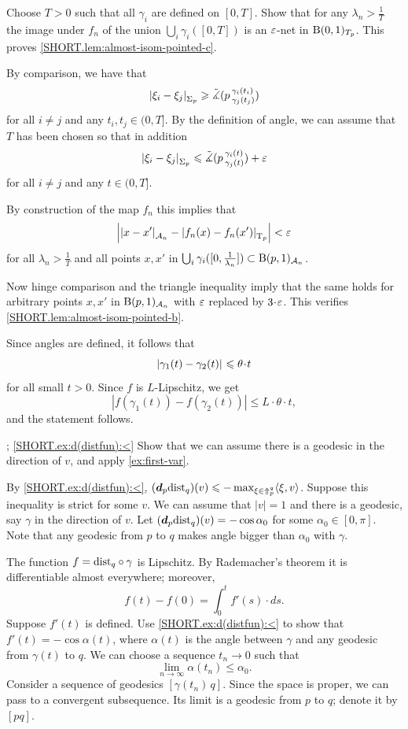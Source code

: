 Choose $T>0$ such that all $\gamma_i$ are defined on $[0,T]$.
Show that for any $\lambda_n>\frac{1}{T}$ the image under $f_n$ of the union $\bigcup_i\gamma_i([0,T])$ is an $\varepsilon$-net in $\mathrm{B}{}(0,1)_{T_p}$.
This proves \ref{SHORT.lem:almost-isom-pointed-c}.

By comparison, we have that
\[\dist{\xi_i}{\xi_j}{\Sigma_p}\ge \angk p{\gamma_i(t_i)}{\gamma_j(t_j)}\]
for all $i\ne j$ and any $t_i,t_j\in (0,T]$.
By the definition of angle, we can assume that $T$ has been chosen so that in addition
\[\dist{\xi_i}{\xi_j}{\Sigma_p}\le \angk p{\gamma_i(t)}{\gamma_j(t)}+\eps\]
for all $i\ne j$ and any $t\in (0,T]$.

By construction of the map $f_n$ this implies that 
\[\left|\dist{x}{x'}{\spc{A}_n}-\dist{f_n(x)}{f_n(x')}{\T_p}\right|<\eps\]
for all $\lambda_n>\frac{1}{T}$ and all points $x,x'$ in $\bigcup_i\gamma_i([0,\frac{1}{\lambda_n}])\subset \mathrm{B}{}(p,1)_{\mathcal{A}_n}$.

Now hinge comparison and the triangle inequality imply that the same holds for arbitrary points $x,x'$ in $\mathrm{B}{}(p,1)_{\mathcal{A}_n}$ with $\varepsilon$ replaced by $3\cdot\eps$.
This verifies \ref{SHORT.lem:almost-isom-pointed-b}.


Since angles are defined, it follows that 
\[\dist{\gamma_1(t)}{\gamma_2(t)}{}\le \theta\cdot t\]
for all small $t>0$.
Since $f$ is $L$-Lipschitz, we get 
\[|f(\gamma_1(t))-f(\gamma_2(t))|\le L\cdot \theta\cdot t,\]
and the statement follows.

\parbf{\ref{ex:d(distfun)}}; \ref{SHORT.ex:d(distfun):<}
Show that we can assume there is a geodesic in the direction of $v$, and apply \ref{ex:first-var}.

By \ref{SHORT.ex:d(distfun):<}, $(\bm{d}_p\mathrm{dist}_q)(v)\leqslant-\max_{\xi\in\Uparrow_p^q}\langle\xi,v\rangle$.
Suppose this inequality is strict for some $v$.
We can assume that $|v|=1$ and there is a geodesic, say $\gamma$ in the direction of $v$.
Let $(\bm{d}_p\mathrm{dist}_q)(v)=-\cos\alpha_0$ for some $\alpha_0\in [0,\pi]$.
Note that any geodesic from $p$ to $q$ makes angle bigger than $\alpha_0$ with $\gamma$.

The function $f=\mathrm{dist}_q\circ\gamma$ is Lipschitz.
By Rademacher's theorem it is differentiable almost everywhere;
moreover, 
\[f(t)-f(0)=\int_0^t f'(s)\cdot ds.\]
Suppose $f'(t)$ is defined.
Use \ref{SHORT.ex:d(distfun):<} to show that 
$f'(t)=-\cos\alpha(t)$, where $\alpha(t)$ is the angle between $\gamma$ and any geodesic from $\gamma(t)$ to $q$.
We can choose a sequence $t_n\to 0$ such that 
\[\lim_{n\to\infty}\alpha(t_n) \le \alpha_0.\]
Consider a sequence of geodesics $[\gamma(t_n)\, q]$.
Since the space is proper, we can pass to a convergent subsequence.
Its limit is a geodesic from $p$ to $q$; denote it by $[pq]$.

